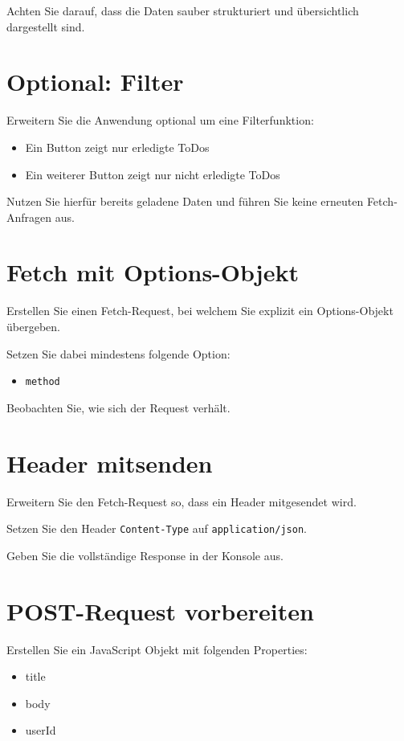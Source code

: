 \documentclass[a4paper,12pt]{article}
\begin{document}
Achten Sie darauf, dass die Daten sauber strukturiert und übersichtlich dargestellt sind.

\section{Optional: Filter}

Erweitern Sie die Anwendung optional um eine Filterfunktion:

\begin{itemize}
    \item Ein Button zeigt nur erledigte ToDos
    \item Ein weiterer Button zeigt nur nicht erledigte ToDos
\end{itemize}

Nutzen Sie hierfür bereits geladene Daten und führen Sie keine erneuten Fetch-Anfragen aus.

\section{Fetch mit Options-Objekt}

Erstellen Sie einen Fetch-Request, bei welchem Sie explizit ein Options-Objekt übergeben.

Setzen Sie dabei mindestens folgende Option:
\begin{itemize}
    \item \texttt{method}
\end{itemize}

Beobachten Sie, wie sich der Request verhält.

\section{Header mitsenden}

Erweitern Sie den Fetch-Request so, dass ein Header mitgesendet wird.

Setzen Sie den Header \texttt{Content-Type} auf \texttt{application/json}.

Geben Sie die vollständige Response in der Konsole aus.

\section{POST-Request vorbereiten}

Erstellen Sie ein JavaScript Objekt mit folgenden Properties:
\begin{itemize}
    \item title
    \item body
    \item userId
\end{itemize}
\end{document}
